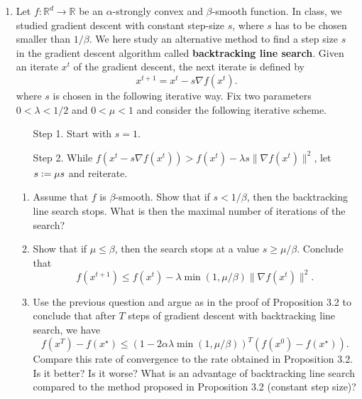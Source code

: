 \documentclass[12pt]{article}
\newcommand{\defeq}{\vcentcolon=}
\newcommand{\dom}{\mathrm{dom}}
\newcommand{\R}{\mathbb{R}}
\begin{document}
\begin{enumerate}
\item  Let $f:\R^d\to \R$ be an $\alpha$-strongly convex and $\beta$-smooth function. In class, we studied gradient descent with constant step-size $s$, where $s$ has to be chosen smaller than $1/\beta$.  We here study an alternative method to find a step size $s$ in the gradient descent algorithm called \textbf{backtracking line search}. Given an iterate $x^t$ of the gradient descent, the next iterate is defined by 
\begin{equation}
x^{t+1} = x^t-s\nabla f(x^t).
\end{equation}
where $s$ is chosen in the following iterative way. Fix two parameters $0<\lambda <1/2$ and $0<\mu<1$ and consider the following iterative scheme.
\begin{enumerate}
\item[Step 1.] Start with $s=1$.
\item[Step 2.] While $f(x^t-s\nabla f(x^t))>f(x^t)-\lambda s\|\nabla f(x^t)\|^2$, let $s\defeq \mu s$ and reiterate.
\end{enumerate}
\begin{enumerate}
\item Assume that $f$ is $\beta$-smooth. Show that if $s<1/\beta$, then the backtracking line search stops. What is then the maximal number of iterations of the search?
\item Show that if $\mu\leq \beta$, then the search stops at a value $s\geq \mu/\beta$. Conclude that
\[ f(x^{t+1}) \leq f(x^t) - \lambda \min(1,\mu/\beta)\|\nabla f(x^t)\|^2.\]
\item Use the previous question and argue as in the proof of Proposition 3.2 to conclude that after $T$ steps of gradient descent with backtracking line search, we have
\[ f(x^T)-f(x^\star)\leq (1-2\alpha\lambda\min(1,\mu/\beta))^T (f(x^0)-f(x^\star)).\]
Compare this rate of convergence to the rate obtained in Proposition 3.2. Is it better? Is it worse? What is an advantage of backtracking line search compared to the method proposed in Proposition 3.2 (constant step size)?
\end{enumerate}

\end{enumerate}
\end{document}
